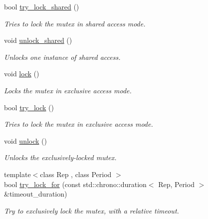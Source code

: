 \begin{DoxyCompactItemize}
bool \hyperlink{classcpen333_1_1process_1_1impl_1_1shared__mutex__exclusive_a0e2e6a0afb83c06d70ceca86e591732f}{try\+\_\+lock\+\_\+shared} ()
\begin{DoxyCompactList}\small\item\em Tries to lock the mutex in shared access mode. \end{DoxyCompactList}\item 
void \hyperlink{classcpen333_1_1process_1_1impl_1_1shared__mutex__exclusive_a01bc4be0f17231c08d8a06f1341acc81}{unlock\+\_\+shared} ()
\begin{DoxyCompactList}\small\item\em Unlocks one instance of shared access. \end{DoxyCompactList}\item 
void \hyperlink{classcpen333_1_1process_1_1impl_1_1shared__mutex__exclusive_a6b6d61dce0f1a536d24e280c4e7ac9a9}{lock} ()
\begin{DoxyCompactList}\small\item\em Locks the mutex in exclusive access mode. \end{DoxyCompactList}\item 
bool \hyperlink{classcpen333_1_1process_1_1impl_1_1shared__mutex__exclusive_aa7b41d55016b38a9d51f23d8c8468857}{try\+\_\+lock} ()
\begin{DoxyCompactList}\small\item\em Tries to lock the mutex in exclusive access mode. \end{DoxyCompactList}\item 
\mbox{\label{classcpen333_1_1process_1_1impl_1_1shared__mutex__exclusive_ae7f2d10376f1b1fffe20141ec136a721}} 
void \hyperlink{classcpen333_1_1process_1_1impl_1_1shared__mutex__exclusive_ae7f2d10376f1b1fffe20141ec136a721}{unlock} ()
\begin{DoxyCompactList}\small\item\em Unlocks the exclusively-\/locked mutex. \end{DoxyCompactList}\item 
{\footnotesize template$<$class Rep , class Period $>$ }\\bool \hyperlink{classcpen333_1_1process_1_1impl_1_1shared__mutex__exclusive_a6f74ff596d66d4ac6b8e7793b8dca78d}{try\+\_\+lock\+\_\+for} (const std\+::chrono\+::duration$<$ Rep, Period $>$ \&timeout\+\_\+duration)
\begin{DoxyCompactList}\small\item\em Try to exclusively lock the mutex, with a relative timeout. \end{DoxyCompactList}\item 

\end{DoxyCompactItemize}
